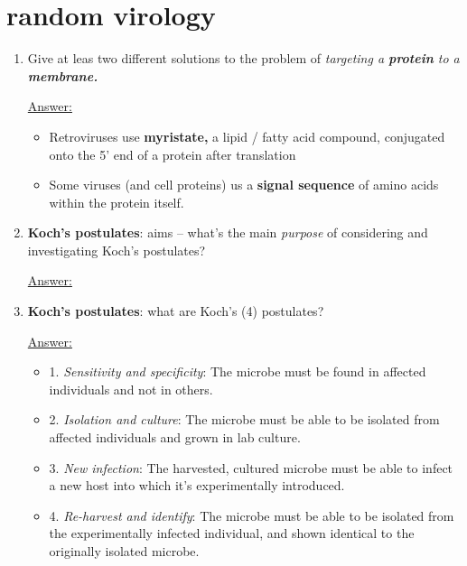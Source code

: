 \documentclass{article}
\newenvironment{QandA}{\begin{enumerate}[label=\bfseries Q\arabic*.]}
                       {\end{enumerate}}
\newenvironment{answered}{\par\normalfont\underline{Answer:}}{}
\begin{document}
\section{random virology}
\begin{QandA}
  \item{Give at leas two different solutions to the problem of \textit{targeting a \textbf{protein} to a \textbf{membrane.}}}
    \begin{answered}
    \begin{itemize}
      \item{Retroviruses use \textbf{myristate,} a lipid / fatty acid compound, conjugated onto the 5' end of a protein after translation}
      \item{Some viruses (and cell proteins) us a \textbf{signal sequence} of amino acids within the protein itself.}
    \end{itemize}
    \end{answered}
  \item{\textbf{Koch's postulates}: aims -- what's the main \textit{purpose} of considering and investigating Koch's postulates?}
    \begin{answered}
    
    \end{answered}
  \item{\textbf{Koch's postulates}: what are Koch's (4) postulates?}
    \begin{answered}
    \begin{itemize}
      \item{1. \textit{Sensitivity and specificity}: The microbe must be found in affected individuals and not in others.}
      \item{2. \textit{Isolation and culture}: The microbe must be able to be isolated from affected individuals and grown in lab culture.}
      \item{3. \textit{New infection}: The harvested, cultured microbe must be able to infect a new host into which it's experimentally introduced.}
      \item{4. \textit{Re-harvest and identify}: The microbe must be able to be isolated from the experimentally infected individual, and shown identical to the originally isolated microbe.}
    \end{itemize}
    \end{answered}
\end{QandA}
\end{document}
